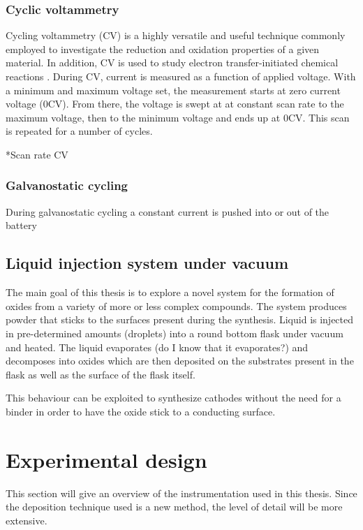 \documentclass[Main/main.tex]{subfiles}
\begin{document}
\subsubsection{Cyclic voltammetry}
Cycling voltammetry (CV) is a highly versatile and useful technique commonly employed to investigate the reduction and oxidation properties of a given material. In addition, CV is used to study electron transfer-initiated chemical reactions \cite{2_CV}. During CV, current is measured as a function of applied voltage. With a minimum and maximum voltage set, the measurement starts at zero current voltage (0CV). From there, the voltage is swept at at constant scan rate to the maximum voltage, then to the minimum voltage and ends up at 0CV. This scan is repeated for a number of cycles.

*Scan rate
CV 

\subsubsection{Galvanostatic cycling}
During galvanostatic cycling a constant current is pushed into or out of the battery



\subsection{Liquid injection system under vacuum}
The main goal of this thesis is to explore a novel system for the formation of oxides from a variety of more or less complex compounds. The system produces powder that sticks to the surfaces present during the synthesis. Liquid is injected in pre-determined amounts (droplets) into a round bottom flask under vacuum and heated. The liquid evaporates (do I know that it evaporates?) and decomposes into oxides which are then deposited on the substrates present in the flask as well as the surface of the flask itself.

This behaviour can be exploited to synthesize cathodes without the need for a binder in order to have the oxide stick to a conducting surface. 


\section{Experimental design}

This section will give an overview of the instrumentation used in this thesis. Since the deposition technique used is a new method, the level of detail will be more extensive.
\end{document}
